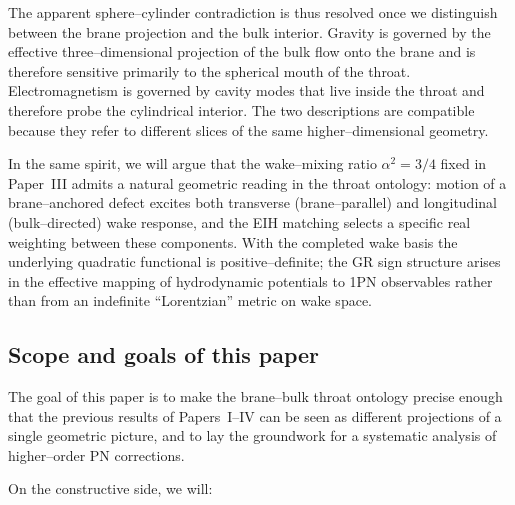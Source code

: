 \documentclass[12pt]{article}
\begin{document}
The apparent sphere–cylinder contradiction is thus resolved once we
distinguish between the brane projection and the bulk interior.  Gravity is
governed by the effective three–dimensional projection of the bulk flow onto
the brane and is therefore sensitive primarily to the spherical mouth of the
throat.  Electromagnetism is governed by cavity modes that live inside the
throat and therefore probe the cylindrical interior.  The two descriptions
are compatible because they refer to different slices of the same
higher–dimensional geometry.

In the same spirit, we will argue that the wake--mixing ratio
$\alpha^2=3/4$ fixed in Paper~III admits a natural geometric reading in the
throat ontology: motion of a brane--anchored defect excites both transverse
(brane--parallel) and longitudinal (bulk--directed) wake response, and the
EIH matching selects a specific real weighting between these components.
With the completed wake basis the underlying quadratic functional is
positive--definite; the GR sign structure arises in the effective mapping of
hydrodynamic potentials to 1PN observables rather than from an indefinite
``Lorentzian'' metric on wake space.

\subsection{Scope and goals of this paper}
\label{subsec:intro_scope}

The goal of this paper is to make the brane--bulk throat ontology precise
enough that the previous results of Papers~I--IV can be seen as different
projections of a single geometric picture, and to lay the groundwork for a
systematic analysis of higher–order PN corrections.

On the constructive side, we will:
\end{document}
